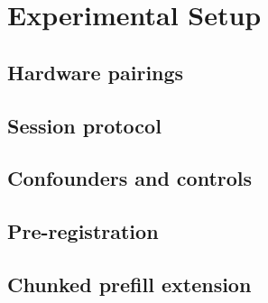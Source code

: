 \section{Experimental Setup}
\label{sec:setup}

\subsection{Hardware pairings}
\label{sec:pairings}

\subsection{Session protocol}
\label{sec:protocol}

\subsection{Confounders and controls}
\label{sec:controls}

\subsection{Pre-registration}
\label{sec:prereg}

\subsection{Chunked prefill extension}
\label{sec:chunked}
